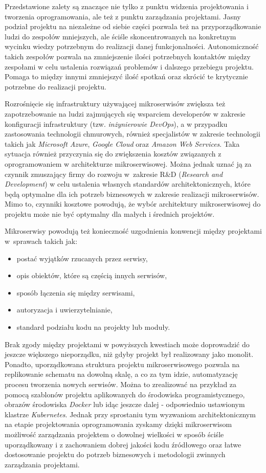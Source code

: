 \documentclass{SGGW-thesis}
\begin{document}
{Przedstawione zalety są znaczące nie tylko z punktu widzenia projektowania i tworzenia oprogramowania, ale też z punktu zarządzania projektami. Jasny podział projektu na niezależne od siebie części pozwala też na przyporządkowanie ludzi do zespołów mniejszych, ale ściśle skoncentrowanych na konkretnym wycinku wiedzy potrzebnym do realizacji danej funkcjonalności.
Autonomiczność takich zespołów pozwala na zmniejszenie ilości potrzebnych kontaktów między zespołami w celu ustalenia rozwiązań problemów i dalszego przebiegu projektu. Pomaga to między innymi zmniejszyć ilość spotkań oraz skrócić te krytycznie potrzebne do realizacji projektu.

Rozrośnięcie się infrastruktury używającej mikroserwisów zwiększa też zapotrzebowanie na ludzi zajmujących się wsparciem developerów w zakresie konfiguracji infrastruktury (tzw. \textit{inżynierowie DevOps}), a w przypadku zastosowania technologii chmurowych, również specjalistów w zakresie technologii takich jak \textit{Microsoft Azure}, \textit{Google Cloud} oraz \textit{Amazon Web Services}. Taka sytuacja również przyczynia się do zwiększenia kosztów związanych z oprogramowaniem w architekturze mikroserwisowej. Można jednak uznać ją za czynnik zmuszający firmy do rozwoju w~zakresie R\&D (\textit{Research and Development}) w celu ustalenia własnych standardów architektonicznych, które będą optymalne dla ich potrzeb biznesowych w zakresie realizacji mikroserwisów. Mimo to, czynniki kosztowe powodują, że wybór architektury mikroserwisowej do projektu może nie być optymalny dla małych i średnich projektów.

Mikroserwisy powodują też konieczność uzgodnienia konwencji między projektami w~sprawach takich jak:

\begin{itemize}
	\item postać wyjątków rzucanych przez serwisy,
	\item opis obiektów, które są częścią innych serwisów,
	\item sposób łączenia się między serwisami,
	\item autoryzacja i uwierzytelnianie,
	\item standard podziału kodu na projekty lub moduły.
\end{itemize}
Brak zgody między projektami w powyższych kwestiach może doprowadzić do jeszcze większego nieporządku, niż gdyby projekt był realizowany jako monolit. Ponadto, uporządkowana struktura projektu mikroserwisowego pozwala na replikowanie schematu na dowolną skalę, a co za tym idzie, automatyzację procesu tworzenia nowych serwisów. Można to zrealizować na przykład za pomocą szablonów projektu aplikowanych do środowiska programistycznego, obrazów środowiska \textit{Docker} lub idąc jeszcze dalej - odpowiednio ustawionym klastrze \textit{Kubernetes}. Jednak przy sprostaniu tym wyzwaniom architektonicznym na etapie projektowania oprogramowania zyskamy dzięki mikroserwisom możliwość zarządzania projektem o dowolnej wielkości w sposób ściśle uporządkowany i z zachowaniem dobrej jakości kodu źródłowego oraz łatwe dostosowanie projektu do potrzeb biznesowych i metodologii zwinnych zarządzania projektami.

}
\end{document}

